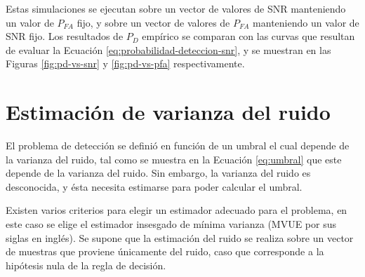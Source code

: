 Estas simulaciones se ejecutan sobre un vector de valores de SNR manteniendo un valor de $P_{FA}$ fijo, y sobre un vector de valores de $P_{FA}$ manteniendo un valor de SNR fijo. Los resultados de $P_D$ empírico se comparan con las curvas que resultan de evaluar la Ecuación \ref{eq:probabilidad-deteccion-snr}, y se muestran en las Figuras \ref{fig:pd-vs-snr} y \ref{fig:pd-vs-pfa} respectivamente. 

\section{Estimación de varianza del ruido}
\label{S:estimacion-ruido}

El problema de detección se definió en función de un umbral el cual depende de la varianza del ruido, tal como se muestra en la Ecuación \ref{eq:umbral} que este depende de la varianza del ruido. Sin embargo, la varianza del ruido es desconocida, y ésta necesita estimarse para poder calcular el umbral. 

Existen varios criterios para elegir un estimador adecuado para el problema, en este caso se elige el estimador insesgado de mínima varianza (MVUE por sus siglas en inglés). Se supone que la estimación del ruido se realiza sobre un vector de muestras que proviene únicamente del ruido, caso que corresponde a la hipótesis nula de la regla de decisión.

